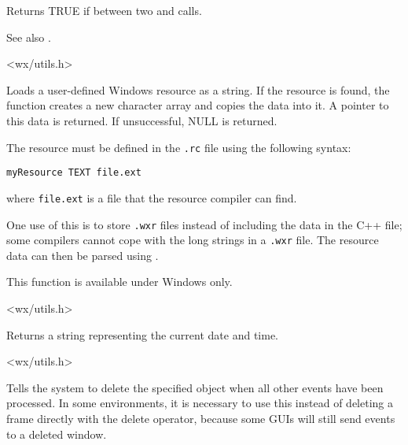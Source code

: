 \label{wxisbusy}


Returns TRUE if between two  and\rtfsp
{} calls.

See also .


<wx/utils.h>

\label{wxloaduserresource}


Loads a user-defined Windows resource as a string. If the resource is found, the function creates
a new character array and copies the data into it. A pointer to this data is returned. If unsuccessful, NULL is returned.

The resource must be defined in the {\tt .rc} file using the following syntax:

\begin{verbatim}
myResource TEXT file.ext
\end{verbatim}

where {\tt file.ext} is a file that the resource compiler can find.

One use of this is to store {\tt .wxr} files instead of including the data in the C++ file; some compilers
cannot cope with the long strings in a {\tt .wxr} file. The resource data can then be parsed
using .

This function is available under Windows only.


<wx/utils.h>

\label{wxnow}


Returns a string representing the current date and time.


<wx/utils.h>

\label{wxpostdelete}


Tells the system to delete the specified object when
all other events have been processed. In some environments, it is
necessary to use this instead of deleting a frame directly with the
delete operator, because some GUIs will still send events to a deleted window.

